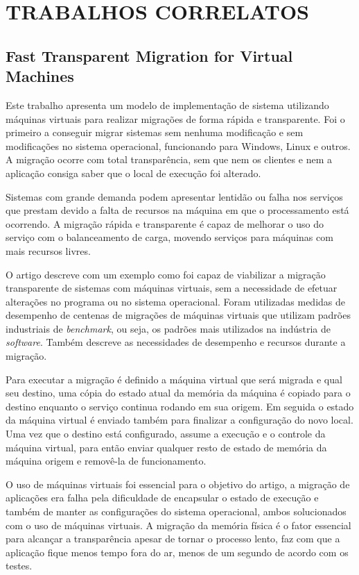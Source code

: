 \chapter{TRABALHOS CORRELATOS}

\section{Fast Transparent Migration for Virtual Machines}
	Este trabalho apresenta um modelo de implementação de sistema utilizando máquinas virtuais para realizar migrações de forma rápida e transparente. Foi o primeiro a conseguir migrar sistemas sem nenhuma modificação e sem modificações no sistema operacional, funcionando para Windows, Linux e outros. A migração ocorre com total transparência, sem que nem os clientes e nem a aplicação consiga saber que o local de execução foi alterado.
	
	Sistemas com grande demanda podem apresentar lentidão ou falha nos serviços que prestam devido a falta de recursos na máquina em que o processamento está ocorrendo. A migração rápida e transparente é capaz de melhorar o uso do serviço com o balanceamento de carga, movendo serviços para máquinas com mais recursos livres.
	
	O artigo descreve com um exemplo como foi capaz de viabilizar a migração transparente de sistemas com máquinas virtuais, sem a necessidade de efetuar alterações no programa ou no sistema operacional. Foram utilizadas medidas de desempenho de centenas de migrações de máquinas virtuais que utilizam padrões industriais de \textit{benchmark}, ou seja, os padrões mais utilizados na indústria de \textit{software}. Também descreve as necessidades de desempenho e recursos durante a migração.
	
	Para executar a migração é definido a máquina virtual que será migrada e qual seu destino, uma cópia do estado atual da memória da máquina é copiado para o destino enquanto o serviço continua rodando em sua origem. Em seguida o estado da máquina virtual é enviado também para finalizar a configuração do novo local. Uma vez que o destino está configurado, assume a execução e o controle da máquina virtual, para então enviar qualquer resto de estado de memória da máquina origem e removê-la de funcionamento.
	
	O uso de máquinas virtuais foi essencial para o objetivo do artigo, a migração de aplicações era falha pela dificuldade de encapsular o estado de execução e também de manter as configurações do sistema operacional, ambos solucionados com o uso de máquinas virtuais. A migração da memória física é o fator essencial para alcançar a transparência apesar de tornar o processo lento, faz com que a aplicação fique menos tempo fora do ar, menos de um segundo de acordo com os testes.
	
